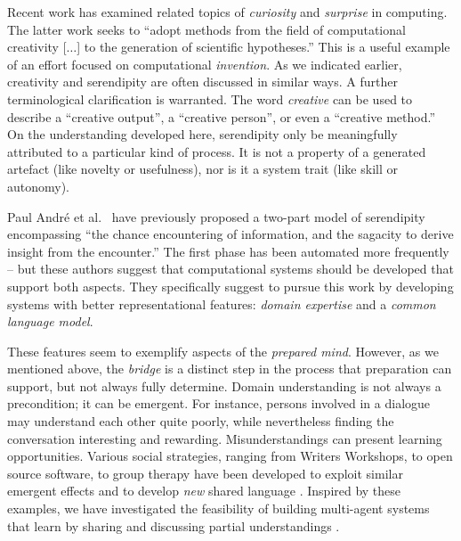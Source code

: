 Recent work has examined related topics of \emph{curiosity}
\cite{wu2013curiosity} and \emph{surprise} \cite{grace2014using} in
computing.  The latter work seeks to ``adopt methods from the field
of computational creativity [$\ldots$] to the generation of scientific hypotheses.''  This is a useful example of an effort focused on computational \emph{invention}.  
%
As we indicated earlier, creativity and serendipity are often discussed in similar ways.
A further terminological clarification is warranted.
The word \emph{creative} can be used to describe a ``creative output'',
a ``creative person'', or even a ``creative method.''
On the understanding developed here, serendipity only be meaningfully attributed to a particular kind of process.
It is not a property of a generated artefact (like novelty or usefulness), nor is it a system trait (like skill or autonomy).

Paul Andr{\'e} et al.~\citeyear{andre2009discovery} have previously proposed a
two-part model of serendipity encompassing ``the chance encountering
of information, and the sagacity to derive insight from the
encounter.''  The first phase has been automated more frequently --
but these authors suggest that computational systems should be
developed that support both aspects.  They specifically suggest to
pursue this work by developing systems with better representational
features: \emph{domain expertise} and a \emph{common language model}.

These features seem to exemplify aspects of the \emph{prepared mind}.
However, as we mentioned above, the \emph{bridge} is a distinct step
in the process that preparation can support, but not always fully
determine.  Domain understanding is not always a precondition; it can
be emergent.  For instance, persons involved in a dialogue may
understand each other quite poorly, while nevertheless finding the
conversation interesting and rewarding.  Misunderstandings can present
learning opportunities.  Various social strategies, ranging from
Writers Workshops, to open source software, to group therapy have been
developed to exploit similar emergent effects and to develop
\emph{new} shared language \cite{gabriel2002writer,seikkula2014open}.
Inspired by these examples, we have investigated the feasibility of
building multi-agent systems that learn by sharing and discussing
partial understandings
\cite{corneli2015computational,corneli2015feedback}.

